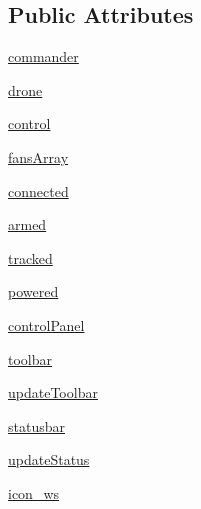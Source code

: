 \subsection*{Public Attributes}
\begin{DoxyCompactItemize}
\item 
\mbox{\hyperlink{classwindshape_1_1gui_1_1_user_interface_1_1_user_interface_aecb418a0d9899fd56fe7e5b03788ae6d}{commander}}
\item 
\mbox{\hyperlink{classwindshape_1_1gui_1_1_user_interface_1_1_user_interface_a6425c413d86840fc24b2b5c6bb9ed80a}{drone}}
\item 
\mbox{\hyperlink{classwindshape_1_1gui_1_1_user_interface_1_1_user_interface_a24ce54ed0c941dbb4c39705faa5cdd6e}{control}}
\item 
\mbox{\hyperlink{classwindshape_1_1gui_1_1_user_interface_1_1_user_interface_a62d63ed0c4f9309cce4154decfb5df10}{fans\+Array}}
\item 
\mbox{\hyperlink{classwindshape_1_1gui_1_1_user_interface_1_1_user_interface_ab81c56170c7e74f0bc50b8eff11f46d1}{connected}}
\item 
\mbox{\hyperlink{classwindshape_1_1gui_1_1_user_interface_1_1_user_interface_a382beef16a15954c5bd2d6a1ba085fe5}{armed}}
\item 
\mbox{\hyperlink{classwindshape_1_1gui_1_1_user_interface_1_1_user_interface_a29a50ab9f2211f8188f5afe40330d37f}{tracked}}
\item 
\mbox{\hyperlink{classwindshape_1_1gui_1_1_user_interface_1_1_user_interface_a4cda43513968048c922c9da13c20e165}{powered}}
\item 
\mbox{\hyperlink{classwindshape_1_1gui_1_1_user_interface_1_1_user_interface_a59ec49d872441f242351ed794f95ea24}{control\+Panel}}
\item 
\mbox{\hyperlink{classwindshape_1_1gui_1_1_user_interface_1_1_user_interface_a49953dde2205dea44c35c748f89e5b7c}{toolbar}}
\item 
\mbox{\hyperlink{classwindshape_1_1gui_1_1_user_interface_1_1_user_interface_a9bbcee98312724b747f07c2e8305ebb6}{update\+Toolbar}}
\item 
\mbox{\hyperlink{classwindshape_1_1gui_1_1_user_interface_1_1_user_interface_aab87e28901a138e048a591a620a1de58}{statusbar}}
\item 
\mbox{\hyperlink{classwindshape_1_1gui_1_1_user_interface_1_1_user_interface_aa5fe538624d89d7957431c956d51986f}{update\+Status}}
\item 
\mbox{\hyperlink{classwindshape_1_1gui_1_1_user_interface_1_1_user_interface_ace0f817e8f7e8369eefb65506eecdc8e}{icon\+\_\+ws}}

\end{DoxyCompactItemize}

